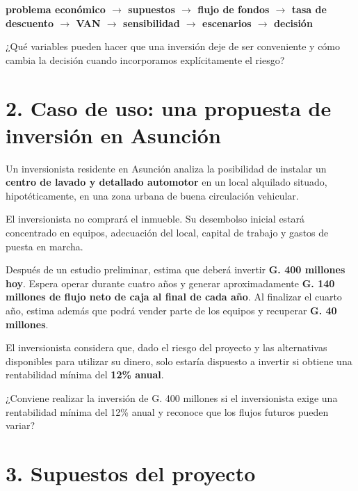 \documentclass[11pt,a4paper]{article}
\begin{document}
\begin{center}
\textbf{problema económico $\rightarrow$ supuestos $\rightarrow$ flujo de fondos $\rightarrow$ tasa de descuento $\rightarrow$ VAN $\rightarrow$ sensibilidad $\rightarrow$ escenarios $\rightarrow$ decisión}
\end{center}

\begin{pregunta}
¿Qué variables pueden hacer que una inversión deje de ser conveniente y cómo cambia la decisión cuando incorporamos explícitamente el riesgo?
\end{pregunta}

\section*{2. Caso de uso: una propuesta de inversión en Asunción}

Un inversionista residente en Asunción analiza la posibilidad de instalar un \textbf{centro de lavado y detallado automotor} en un local alquilado situado, hipotéticamente, en una zona urbana de buena circulación vehicular.

El inversionista no comprará el inmueble. Su desembolso inicial estará concentrado en equipos, adecuación del local, capital de trabajo y gastos de puesta en marcha.

Después de un estudio preliminar, estima que deberá invertir \textbf{G. 400 millones hoy}. Espera operar durante cuatro años y generar aproximadamente \textbf{G. 140 millones de flujo neto de caja al final de cada año}. Al finalizar el cuarto año, estima además que podrá vender parte de los equipos y recuperar \textbf{G. 40 millones}.

El inversionista considera que, dado el riesgo del proyecto y las alternativas disponibles para utilizar su dinero, solo estaría dispuesto a invertir si obtiene una rentabilidad mínima del \textbf{12\% anual}.

\begin{pregunta}
¿Conviene realizar la inversión de G. 400 millones si el inversionista exige una rentabilidad mínima del 12\% anual y reconoce que los flujos futuros pueden variar?
\end{pregunta}

\section*{3. Supuestos del proyecto}
\end{document}
